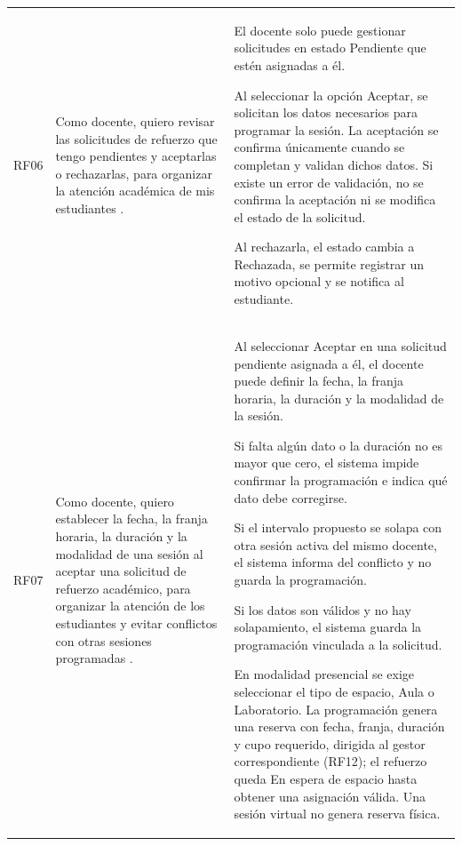 \begin{longtable}{@{}p{}p{}p{}@{}}
RF06 &
Como docente, quiero revisar las solicitudes de refuerzo
que tengo pendientes y aceptarlas o rechazarlas, para
organizar la atención académica de mis estudiantes \cite{Daz2025}. &
El docente solo puede gestionar solicitudes en estado
Pendiente que estén asignadas a él.
\par\smallskip\noindent
Al seleccionar la opción Aceptar, se solicitan los
datos necesarios para programar la sesión.
La aceptación se confirma únicamente cuando
se completan y validan dichos datos.
Si existe un error de validación, no se confirma
la aceptación ni se modifica el estado de la solicitud.
\par\smallskip\noindent
Al rechazarla, el estado cambia a Rechazada, se permite
registrar un motivo opcional y se notifica al estudiante. \\

RF07 &
Como docente, quiero establecer la fecha, la franja
horaria, la duración y la modalidad de una sesión al
aceptar una solicitud de refuerzo académico, para
organizar la atención de los estudiantes y evitar
conflictos con otras sesiones programadas \cite{Daz2025}. &
Al seleccionar Aceptar en una solicitud pendiente asignada
a él, el docente puede definir la fecha, la franja horaria,
la duración y la modalidad de la sesión.
\par\smallskip\noindent
Si falta algún dato o la duración no es mayor que cero,
el sistema impide confirmar la programación e indica
qué dato debe corregirse.
\par\smallskip\noindent
Si el intervalo propuesto se solapa con otra sesión activa
del mismo docente, el sistema informa del conflicto y no
guarda la programación.
\par\smallskip\noindent
Si los datos son válidos y no hay solapamiento, el sistema
guarda la programación vinculada a la solicitud.
\par\smallskip\noindent
En modalidad presencial se exige seleccionar el tipo de
espacio, Aula o Laboratorio. La programación genera una
reserva con fecha, franja, duración y cupo requerido,
dirigida al gestor correspondiente (RF12); el refuerzo queda
En espera de espacio hasta obtener una asignación válida.
Una sesión virtual no genera reserva física. \\


\end{longtable}
